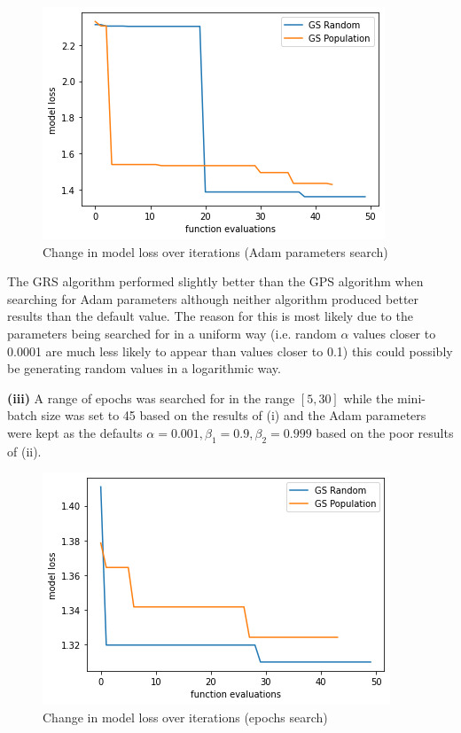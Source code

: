 \documentclass[12pt]{article}
\begin{document}
\begin{figure}[h]
    \centering
    \includegraphics[scale=0.55]{figs/c/c_ii.png}
    \caption{Change in model loss over iterations (Adam parameters search)}
    \label{fig:c_i}
\end{figure}

The GRS algorithm performed slightly better than the GPS algorithm when searching for Adam parameters although neither algorithm produced better results than the default value. The reason for this is most likely due to the parameters being searched for in a uniform way (i.e. random $\alpha$ values closer to 0.0001 are much less likely to appear than values closer to 0.1) this could possibly be generating random values in a logarithmic way.

\noindent \textbf{(iii)} A range of epochs was searched for in the range $[5, 30]$ while the mini-batch size was set to 45 based on the results of (i) and the Adam parameters were kept as the defaults $\alpha=0.001, \beta_1=0.9, \beta_2=0.999$ based on the poor results of (ii).

\begin{figure}[h]
    \centering
    \includegraphics[scale=0.55]{figs/c/c_iii.png}
    \caption{Change in model loss over iterations (epochs search)}
    \label{fig:c_i}
\end{figure}
\end{document}
